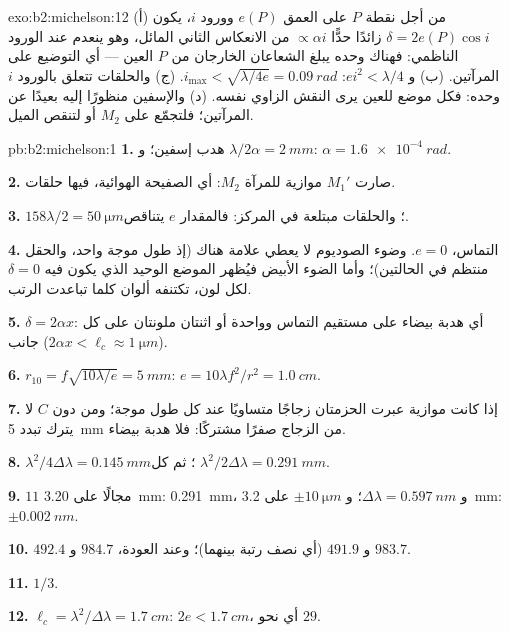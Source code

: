 \begin{solution}{exo:b2:michelson:12}
(أ) من أجل نقطة $P$ على العمق $e(P)$ وورود $i$، يكون $\delta = 2e(P)\cos i$
زائدًا حدًّا $\propto\alpha i$ من الانعكاس الثاني المائل، وهو
ينعدم عند الورود الناظمي: فهناك وحده يبلغ الشعاعان الخارجان من $P$
العين --- أي التوضيع على المرآتين. (ب) و $ei^2 < \lambda/4$: $i_{\max} <
\sqrt{\lambda/4e} = \qty{0.09}{rad}$. (ج) والحلقات تتعلق بالورود $i$ وحده: فكل موضع
للعين يرى النقش الزاوي نفسه. (د) والإسفين منظورًا إليه بعيدًا عن
المرآتين؛ فلتجمّع على $M_2$ أو لتنقص الميل.
\end{solution}

\begin{solution}{pb:b2:michelson:1}
\textbf{1.} هدب إسفين؛ و $\lambda/2\alpha = \qty{2}{mm}$: $\alpha = \qty{1.6e-4}{rad}$.

\textbf{2.} صارت $M_1'$ موازية للمرآة $M_2$: أي الصفيحة الهوائية،  فيها حلقات.

\textbf{3.} $158\lambda/2 = \qty{50}{\micro m}$؛ والحلقات مبتلعة في المركز: فالمقدار $e$
يتناقص.

\textbf{4.} التماس، $e = 0$. وضوء الصوديوم لا يعطي علامة هناك (إذ طول
موجة واحد، والحقل منتظم في الحالتين)؛ وأما الضوء الأبيض فيُظهر الموضع
الوحيد الذي يكون فيه $\delta = 0$ لكل لون، تكتنفه ألوان كلما تباعدت
الرتب.

\textbf{5.} $\delta = 2\alpha x$: أي هدبة بيضاء على مستقيم التماس وواحدة أو
اثنتان ملونتان على كل جانب ($2\alpha x < \ell_c \approx \qty{1}{\micro m}$).

\textbf{6.} $r_{10} = f\sqrt{10\lambda/e} = \qty{5}{mm}$: $e = 10\lambda f^2/r^2 = \qty{1.0}{cm}$.

\textbf{7.} إذا كانت موازية عبرت الحزمتان زجاجًا متساويًا عند كل
طول موجة؛ ومن دون $C$ لا يترك تبدد \qty{5}{mm} من الزجاج
صفرًا مشتركًا: فلا هدبة بيضاء.

\textbf{8.} $\lambda^2/4\Delta\lambda = \qty{0.145}{mm}$؛ ثم كل $\lambda^2/2\Delta\lambda = \qty{0.291}{mm}$.

\textbf{9.} $11$ مجالًا على \qty{3.20}{mm}: \qty{0.291}{mm}، و $\Delta\lambda = \qty{0.597}{nm}$؛
و $\pm\qty{10}{\micro m}$ على \qty{3.2}{mm}: $\pm\qty{0.002}{nm}$.

\textbf{10.} $492.4$ و $491.9$ (أي نصف رتبة بينهما)؛ وعند العودة،
$984.7$ و $983.7$.

\textbf{11.} $1/3$.

\textbf{12.} $\ell_c = \lambda^2/\Delta\lambda = \qty{1.7}{cm}$: $2e < \qty{1.7}{cm}$، أي نحو $29$.


\end{solution}
